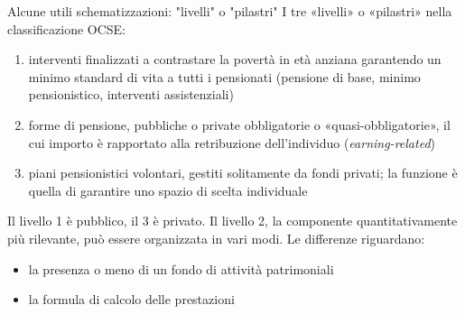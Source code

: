 \documentclass[11pt]{beamer}
\begin{document}
\begin{frame}{Alcune utili schematizzazioni: "livelli" o "pilastri"}
I tre «livelli» o «pilastri» nella classificazione OCSE:
\begin{enumerate}
\item interventi finalizzati a contrastare la povertà in età anziana garantendo
un minimo standard di vita a tutti i pensionati (pensione di base, minimo
pensionistico, interventi assistenziali)
\item forme di pensione, pubbliche o private obbligatorie o «quasi-obbligatorie»,
il cui importo è rapportato alla retribuzione dell’individuo
(\emph{earning-related})
\item piani pensionistici volontari, gestiti solitamente da fondi privati; la
funzione è quella di garantire uno spazio di scelta individuale
\end{enumerate}

Il livello 1 è pubblico, il 3 è privato. Il livello 2, la componente
quantitativamente più rilevante, può essere organizzata in vari modi. Le differenze riguardano:
\begin{itemize}
\item la presenza o meno di un fondo di attività patrimoniali
\item la formula di calcolo delle prestazioni
\end{itemize}
\end{frame}
\end{document}
